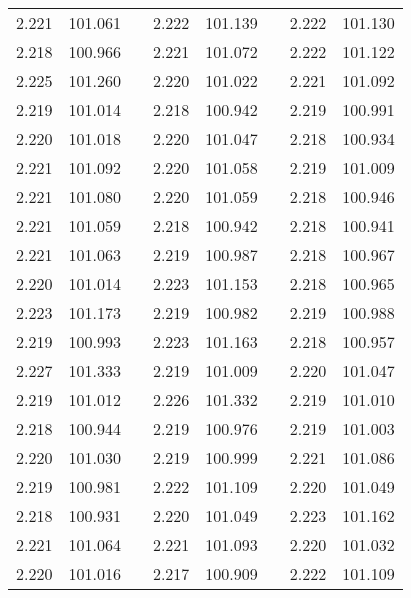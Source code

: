 \documentclass[12pt]{mwrep}
\begin{document}
\begin{table}[H]
\begin{tabularx}{\textwidth}{|Y|Y|p{2mm}|Y|Y|p{2mm}|Y|Y|}
			2.221 & 101.061 && 2.222 & 101.139 && 2.222 & 101.130 \\
			2.218 & 100.966 && 2.221 & 101.072 && 2.222 & 101.122 \\
			2.225 & 101.260 && 2.220 & 101.022 && 2.221 & 101.092 \\
			2.219 & 101.014 && 2.218 & 100.942 && 2.219 & 100.991 \\
			2.220 & 101.018 && 2.220 & 101.047 && 2.218 & 100.934 \\
			2.221 & 101.092 && 2.220 & 101.058 && 2.219 & 101.009 \\
			2.221 & 101.080 && 2.220 & 101.059 && 2.218 & 100.946 \\
			2.221 & 101.059 && 2.218 & 100.942 && 2.218 & 100.941 \\
			2.221 & 101.063 && 2.219 & 100.987 && 2.218 & 100.967 \\
			2.220 & 101.014 && 2.223 & 101.153 && 2.218 & 100.965 \\
			2.223 & 101.173 && 2.219 & 100.982 && 2.219 & 100.988 \\
			2.219 & 100.993 && 2.223 & 101.163 && 2.218 & 100.957 \\
			2.227 & 101.333 && 2.219 & 101.009 && 2.220 & 101.047 \\
			2.219 & 101.012 && 2.226 & 101.332 && 2.219 & 101.010 \\
			2.218 & 100.944 && 2.219 & 100.976 && 2.219 & 101.003 \\
			2.220 & 101.030 && 2.219 & 100.999 && 2.221 & 101.086 \\
			2.219 & 100.981 && 2.222 & 101.109 && 2.220 & 101.049 \\
			2.218 & 100.931 && 2.220 & 101.049 && 2.223 & 101.162 \\
			2.221 & 101.064 && 2.221 & 101.093 && 2.220 & 101.032 \\
			2.220 & 101.016 && 2.217 & 100.909 && 2.222 & 101.109 \\

\end{tabularx}
\end{table}
\end{document}
